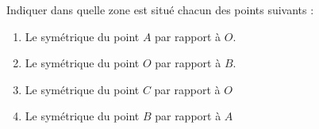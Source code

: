 
\begin{exercice}\label{exosmath-0987}

    Indiquer dans quelle zone est situé chacun des points suivants :
    \begin{enumerate}
        \item
            Le symétrique du point \( A\) par rapport à \( O\).
        \item
            Le symétrique du point \( O\) par rapport à \( B\).
        \item
            Le symétrique du point \( C\) par rapport à \( O\)
        \item
            Le symétrique du point \( B\) par rapport à \( A\)
    \end{enumerate}

\begin{center}
   
\end{center}


\end{exercice}
